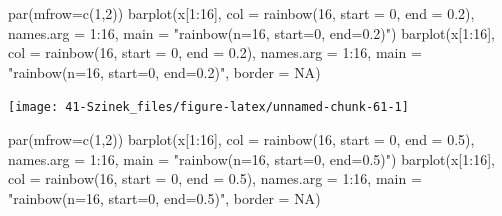 \documentclass[
]{book}
\newenvironment{Shaded}{\begin{snugshade}}{\end{snugshade}}
\newcommand{\AttributeTok}[1]{\textcolor[rgb]{0.77,0.63,0.00}{#1}}
\newcommand{\ConstantTok}[1]{\textcolor[rgb]{0.00,0.00,0.00}{#1}}
\newcommand{\DecValTok}[1]{\textcolor[rgb]{0.00,0.00,0.81}{#1}}
\newcommand{\FloatTok}[1]{\textcolor[rgb]{0.00,0.00,0.81}{#1}}
\newcommand{\FunctionTok}[1]{\textcolor[rgb]{0.00,0.00,0.00}{#1}}
\newcommand{\NormalTok}[1]{#1}
\newcommand{\SpecialCharTok}[1]{\textcolor[rgb]{0.00,0.00,0.00}{#1}}
\newcommand{\StringTok}[1]{\textcolor[rgb]{0.31,0.60,0.02}{#1}}
\begin{document}
\begin{Shaded}
\begin{Highlighting}[]
\FunctionTok{par}\NormalTok{(}\AttributeTok{mfrow=}\FunctionTok{c}\NormalTok{(}\DecValTok{1}\NormalTok{,}\DecValTok{2}\NormalTok{))}
\FunctionTok{barplot}\NormalTok{(x[}\DecValTok{1}\SpecialCharTok{:}\DecValTok{16}\NormalTok{], }\AttributeTok{col =} \FunctionTok{rainbow}\NormalTok{(}\DecValTok{16}\NormalTok{, }\AttributeTok{start =} \DecValTok{0}\NormalTok{, }\AttributeTok{end =} \FloatTok{0.2}\NormalTok{), }\AttributeTok{names.arg =} \DecValTok{1}\SpecialCharTok{:}\DecValTok{16}\NormalTok{, }
    \AttributeTok{main =} \StringTok{"rainbow(n=16, start=0, end=0.2)"}\NormalTok{)}
\FunctionTok{barplot}\NormalTok{(x[}\DecValTok{1}\SpecialCharTok{:}\DecValTok{16}\NormalTok{], }\AttributeTok{col =} \FunctionTok{rainbow}\NormalTok{(}\DecValTok{16}\NormalTok{, }\AttributeTok{start =} \DecValTok{0}\NormalTok{, }\AttributeTok{end =} \FloatTok{0.2}\NormalTok{), }\AttributeTok{names.arg =} \DecValTok{1}\SpecialCharTok{:}\DecValTok{16}\NormalTok{, }
    \AttributeTok{main =} \StringTok{"rainbow(n=16, start=0, end=0.2)"}\NormalTok{, }\AttributeTok{border =} \ConstantTok{NA}\NormalTok{)}
\end{Highlighting}
\end{Shaded}

\begin{center}\texttt{[image: 41-Szinek\_files/figure-latex/unnamed-chunk-61-1]} \end{center}

\begin{Shaded}
\begin{Highlighting}[]
\FunctionTok{par}\NormalTok{(}\AttributeTok{mfrow=}\FunctionTok{c}\NormalTok{(}\DecValTok{1}\NormalTok{,}\DecValTok{2}\NormalTok{))}
\FunctionTok{barplot}\NormalTok{(x[}\DecValTok{1}\SpecialCharTok{:}\DecValTok{16}\NormalTok{], }\AttributeTok{col =} \FunctionTok{rainbow}\NormalTok{(}\DecValTok{16}\NormalTok{, }\AttributeTok{start =} \DecValTok{0}\NormalTok{, }\AttributeTok{end =} \FloatTok{0.5}\NormalTok{), }\AttributeTok{names.arg =} \DecValTok{1}\SpecialCharTok{:}\DecValTok{16}\NormalTok{, }
    \AttributeTok{main =} \StringTok{"rainbow(n=16, start=0, end=0.5)"}\NormalTok{)}
\FunctionTok{barplot}\NormalTok{(x[}\DecValTok{1}\SpecialCharTok{:}\DecValTok{16}\NormalTok{], }\AttributeTok{col =} \FunctionTok{rainbow}\NormalTok{(}\DecValTok{16}\NormalTok{, }\AttributeTok{start =} \DecValTok{0}\NormalTok{, }\AttributeTok{end =} \FloatTok{0.5}\NormalTok{), }\AttributeTok{names.arg =} \DecValTok{1}\SpecialCharTok{:}\DecValTok{16}\NormalTok{, }
    \AttributeTok{main =} \StringTok{"rainbow(n=16, start=0, end=0.5)"}\NormalTok{, }\AttributeTok{border =} \ConstantTok{NA}\NormalTok{)}
\end{Highlighting}
\end{Shaded}
\end{document}
